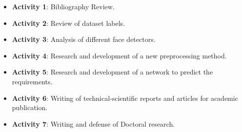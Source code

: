 \begin{itemize}
\item \textbf{Activity 1}: Bibliography Review.
\item \textbf{Activity 2}: Review of dataset labels.
\item \textbf{Activity 3}: Analysis of different face detectors.
\item \textbf{Activity 4}: Research and development of a new preprocessing method.
\item \textbf{Activity 5}: Research and development of a network to predict the \eyecenterlocation requirements.
\item \textbf{Activity 6}: Writing of technical-scientific reports and articles for academic publication.
\item \textbf{Activity 7}: Writing and defense of Doctoral research.
\end{itemize}
